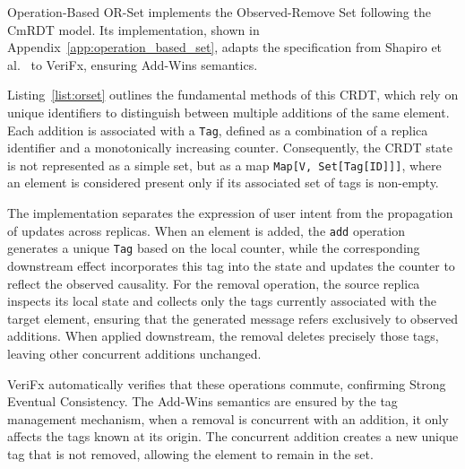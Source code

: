 Operation-Based OR-Set implements the Observed-Remove Set following the CmRDT model. Its implementation, shown in Appendix~\ref{app:operation_based_set}, adapts the specification from Shapiro et al.~\cite{shapiro2011comprehensive} to VeriFx, ensuring Add-Wins semantics.

Listing~\ref{list:orset} outlines the fundamental methods of this CRDT, which rely on unique identifiers to distinguish between multiple additions of the same element. Each addition is associated with a \texttt{Tag}, defined as a combination of a replica identifier and a monotonically increasing counter. Consequently, the CRDT state is not represented as a simple set, but as a map \texttt{Map[V, Set[Tag[ID]]]}, where an element is considered present only if its associated set of tags is non-empty.

The implementation separates the expression of user intent from the propagation of updates across replicas. When an element is added, the \texttt{add} operation generates a unique \texttt{Tag} based on the local counter, while the corresponding downstream effect incorporates this tag into the state and updates the counter to reflect the observed causality. For the removal operation, the source replica inspects its local state and collects only the tags currently associated with the target element, ensuring that the generated message refers exclusively to observed additions. When applied downstream, the removal deletes precisely those tags, leaving other concurrent additions unchanged.

VeriFx automatically verifies that these operations commute, confirming Strong Eventual Consistency. The Add-Wins semantics are ensured by the tag management mechanism, when a removal is concurrent with an addition, it only affects the tags known at its origin. The concurrent addition creates a new unique tag that is not removed, allowing the element to remain in the set.

